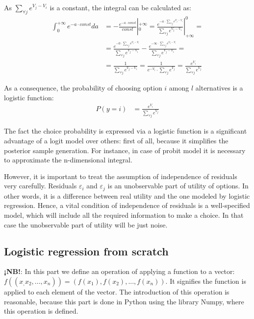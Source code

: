\documentclass[a4paper, 12pt]{extreport}
\begin{document}
As $\sum_{\forall j}e^{V_j - V_i}$ is a constant, the integral can be calculated as:
\begin{align}
	\int_{0}^{+\infty} e^{-a \cdot const} da &= -\frac{e^{-a \cdot const}}{const}|_0^{+\infty} = \frac{e^{-a \cdot \sum_{\forall j}e^{V_j - V_i}}}{\sum_{\forall j}e^{V_j - V_i}}|_{+\infty}^0 = \nonumber \\
	&= \frac{e^{-0 \cdot \sum_{\forall j}e^{V_j - V_i}}}{\sum_{\forall j}e^{V_j - V_i}} - \frac{e^{-\infty \cdot \sum_{\forall j}e^{V_j - V_i}}}{\sum_{\forall j}e^{V_j - V_i}} = \nonumber \\
	&= \frac{1}{\sum_{\forall j}e^{V_j - V_i}} = \frac{1}{e^{-V_i} \cdot \sum_{\forall j}e^{V_j}} = \frac{e^{V_i}}{\sum_{\forall j}e^{V_j}}
\end{align}

As a consequence, the probability of choosing option $i$ among $l$ alternatives is a logistic function:
\begin{align}
	P(y = i) &= \frac{e^{V_i}}{\sum_{\forall j}e^{V_j}}
\end{align}


The fact the choice probability is expressed via a logistic function is a significant advantage of a logit model over others: first of all, because it simplifies the posterior sample generation.
For instance, in case of probit model it is necessary to approximate the n-dimensional integral.

However, it is important to treat the assumption of independence of residuals very carefully. Residuals $\varepsilon_i$ and $\varepsilon_j$ is an unobservable part of utility of options. In other words,
it is a difference between real utility and the one modeled by logistic regression. Hence, a vital condition of independence of residuals is a well-specified model, which will include
all the required information to make a choice. In that case the unobservable part of utility will be just noise.

\subsection{Logistic regression from scratch}
\textbf{¡NB!}: In this part we define an operation of applying a function to a vector: $f((x_, x_2, ..., x_n)) = (f(x_1), f(x_2), ..., f(x_n))$. It signifies the function is applied to each element of the vector. The introduction of this operation is reasonable, because
this part is done in Python using the library Numpy, where this operation is defined.
\end{document}
